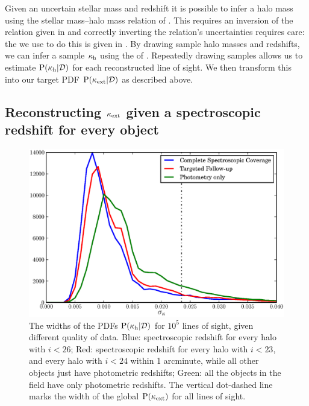 \documentclass[useAMS,usenatbib,a4paper]{mn2e}
\begin{document}

Given an uncertain stellar mass and redshift it is possible to infer a
halo mass using the stellar mass--halo mass relation of
\citet{BehrooziEtal2010}. This \proceedure requires an inversion of the
relation given in \citet{BehrooziEtal2010} and correctly inverting the
relation's uncertainties requires care: the \proceedure we use to do this
is given in . By drawing sample halo masses
and redshifts, we can infer a sample $\kappa_{\rm h}$ using the \proceedure of
. Repeatedly drawing samples allows us to
estimate ${\rm P}(\kappa_{\rm h}|{\mathcal{D}})$ for each reconstructed line of sight. We then
transform this into our target PDF ${\rm P}(\kappa_{\rm ext}|{\mathcal{D}})$ as described above.



\subsection{Reconstructing $\kappa_{\rm ext}$ given a spectroscopic redshift for every object}

\begin{figure}
\includegraphics[width=\columnwidth]{figs/Width.eps}
\caption{The widths of the \infered PDFs ${\rm P}(\kappa_{\rm h}|{\mathcal{D}})$ for
$10^5$ lines of sight, given different quality of data. 
Blue: spectroscopic redshift for every halo with $i<26$; 
Red: spectroscopic redshift for every halo with $i<23$, 
and every halo with $i<24$ within 1 arcminute, while all other objects just
have photometric redshifts;
Green: all the objects in the field have only photometric redshifts. The
vertical dot-dashed line marks the width of the global ${\rm P}(\kappa_{\rm ext})$ for all
lines of sight.}
\label{fig:reconwidths}
\end{figure}
\end{document}
